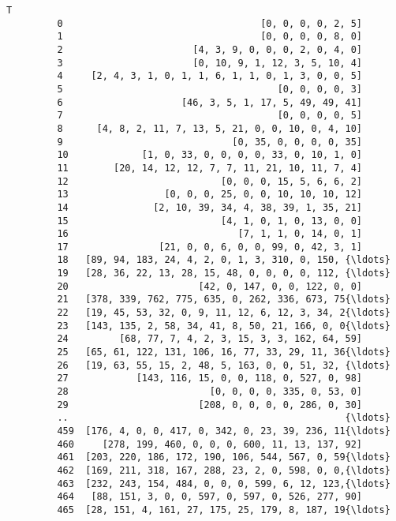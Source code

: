 \documentclass[11pt]{article}
\begin{document}
\begin{Verbatim}[commandchars=\\\{\}]
                                                              T  
         0                                   [0, 0, 0, 0, 2, 5]  
         1                                   [0, 0, 0, 0, 8, 0]  
         2                       [4, 3, 9, 0, 0, 0, 2, 0, 4, 0]  
         3                       [0, 10, 9, 1, 12, 3, 5, 10, 4]  
         4     [2, 4, 3, 1, 0, 1, 1, 6, 1, 1, 0, 1, 3, 0, 0, 5]  
         5                                      [0, 0, 0, 0, 3]  
         6                     [46, 3, 5, 1, 17, 5, 49, 49, 41]  
         7                                      [0, 0, 0, 0, 5]  
         8      [4, 8, 2, 11, 7, 13, 5, 21, 0, 0, 10, 0, 4, 10]  
         9                              [0, 35, 0, 0, 0, 0, 35]  
         10             [1, 0, 33, 0, 0, 0, 0, 33, 0, 10, 1, 0]  
         11        [20, 14, 12, 12, 7, 7, 11, 21, 10, 11, 7, 4]  
         12                           [0, 0, 0, 15, 5, 6, 6, 2]  
         13                 [0, 0, 0, 25, 0, 0, 10, 10, 10, 12]  
         14               [2, 10, 39, 34, 4, 38, 39, 1, 35, 21]  
         15                           [4, 1, 0, 1, 0, 13, 0, 0]  
         16                              [7, 1, 1, 0, 14, 0, 1]  
         17                [21, 0, 0, 6, 0, 0, 99, 0, 42, 3, 1]  
         18   [89, 94, 183, 24, 4, 2, 0, 1, 3, 310, 0, 150, {\ldots}  
         19   [28, 36, 22, 13, 28, 15, 48, 0, 0, 0, 0, 112, {\ldots}  
         20                       [42, 0, 147, 0, 0, 122, 0, 0]  
         21   [378, 339, 762, 775, 635, 0, 262, 336, 673, 75{\ldots}  
         22   [19, 45, 53, 32, 0, 9, 11, 12, 6, 12, 3, 34, 2{\ldots}  
         23   [143, 135, 2, 58, 34, 41, 8, 50, 21, 166, 0, 0{\ldots}  
         24         [68, 77, 7, 4, 2, 3, 15, 3, 3, 162, 64, 59]  
         25   [65, 61, 122, 131, 106, 16, 77, 33, 29, 11, 36{\ldots}  
         26   [19, 63, 55, 15, 2, 48, 5, 163, 0, 0, 51, 32, {\ldots}  
         27            [143, 116, 15, 0, 0, 118, 0, 527, 0, 98]  
         28                         [0, 0, 0, 0, 335, 0, 53, 0]  
         29                       [208, 0, 0, 0, 0, 286, 0, 30]  
         ..                                                 {\ldots}  
         459  [176, 4, 0, 0, 417, 0, 342, 0, 23, 39, 236, 11{\ldots}  
         460     [278, 199, 460, 0, 0, 0, 600, 11, 13, 137, 92]  
         461  [203, 220, 186, 172, 190, 106, 544, 567, 0, 59{\ldots}  
         462  [169, 211, 318, 167, 288, 23, 2, 0, 598, 0, 0,{\ldots}  
         463  [232, 243, 154, 484, 0, 0, 0, 599, 6, 12, 123,{\ldots}  
         464   [88, 151, 3, 0, 0, 597, 0, 597, 0, 526, 277, 90]  
         465  [28, 151, 4, 161, 27, 175, 25, 179, 8, 187, 19{\ldots}  

\end{Verbatim}
\end{document}
